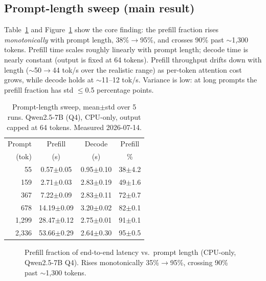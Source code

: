 \documentclass[sigconf,nonacm,10pt]{acmart}
\begin{document}
\subsection{Prompt-length sweep (main result)}
\label{sec:results-promptlen}
Table~\ref{tab:sweep} and Figure~\ref{fig:promptlen} show the core finding:
the prefill fraction rises \emph{monotonically} with prompt length,
38\%$\rightarrow$95\%, and crosses 90\% past $\sim$1{,}300 tokens. Prefill
time scales roughly linearly with prompt length; decode time is nearly
constant (output is fixed at 64 tokens). Prefill throughput drifts down
with length ($\sim$50$\rightarrow$44 tok/s over the realistic range) as
per-token attention cost grows, while decode holds at $\sim$11--12 tok/s.
Variance is low: at long prompts the prefill fraction has std $\leq$0.5
percentage points.

\begin{table}[t]
  \centering
  \caption{Prompt-length sweep, mean$\pm$std over 5 runs. Qwen2.5-7B (Q4),
  CPU-only, output capped at 64 tokens. Measured 2026-07-14.}
  \label{tab:sweep}
  \begin{tabular}{rccc}
    \toprule
    Prompt & Prefill & Decode & Prefill \\
    (tok)  & (s)     & (s)    & \% \\
    \midrule
    55      & 0.57$\pm$0.05  & 0.95$\pm$0.10 & 38$\pm$4.2 \\
    159     & 2.71$\pm$0.03  & 2.83$\pm$0.19 & 49$\pm$1.6 \\
    367     & 7.22$\pm$0.09  & 2.83$\pm$0.11 & 72$\pm$0.7 \\
    678     & 14.19$\pm$0.09 & 3.20$\pm$0.02 & 82$\pm$0.1 \\
    1{,}299 & 28.47$\pm$0.12 & 2.75$\pm$0.01 & 91$\pm$0.1 \\
    2{,}336 & 53.66$\pm$0.29 & 2.64$\pm$0.30 & 95$\pm$0.5 \\
    \bottomrule
  \end{tabular}
\end{table}

\begin{figure}[t]
  \centering
  \caption{Prefill fraction of end-to-end latency vs.\ prompt length
  (CPU-only, Qwen2.5-7B Q4). Rises monotonically 35\%$\rightarrow$95\%,
  crossing 90\% past $\sim$1{,}300 tokens.}
  \label{fig:promptlen}
\end{figure}
\end{document}
